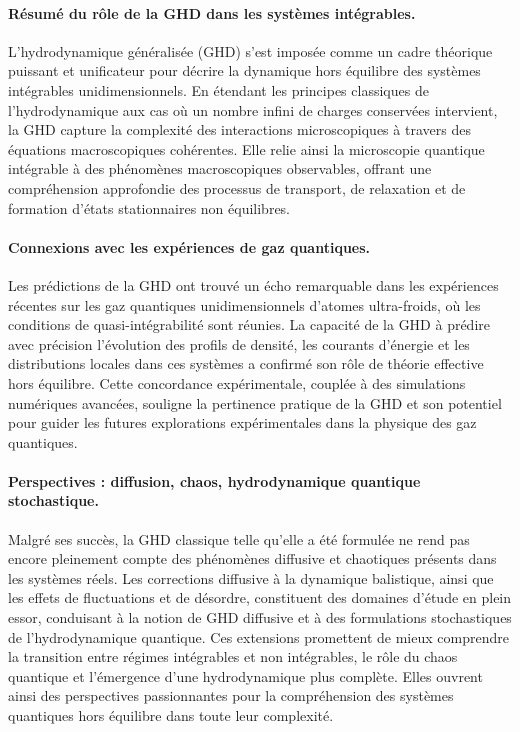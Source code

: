 \paragraph{Résumé du rôle de la GHD dans les systèmes intégrables.}
L’hydrodynamique généralisée (GHD) s’est imposée comme un cadre théorique puissant et unificateur pour décrire la dynamique hors équilibre des systèmes intégrables unidimensionnels. En étendant les principes classiques de l’hydrodynamique aux cas où un nombre infini de charges conservées intervient, la GHD capture la complexité des interactions microscopiques à travers des équations macroscopiques cohérentes. Elle relie ainsi la microscopie quantique intégrable à des phénomènes macroscopiques observables, offrant une compréhension approfondie des processus de transport, de relaxation et de formation d’états stationnaires non équilibres.

\paragraph{Connexions avec les expériences de gaz quantiques.}
Les prédictions de la GHD ont trouvé un écho remarquable dans les expériences récentes sur les gaz quantiques unidimensionnels d’atomes ultra-froids, où les conditions de quasi-intégrabilité sont réunies. La capacité de la GHD à prédire avec précision l’évolution des profils de densité, les courants d’énergie et les distributions locales dans ces systèmes a confirmé son rôle de théorie effective hors équilibre. Cette concordance expérimentale, couplée à des simulations numériques avancées, souligne la pertinence pratique de la GHD et son potentiel pour guider les futures explorations expérimentales dans la physique des gaz quantiques.

\paragraph{Perspectives : diffusion, chaos, hydrodynamique quantique stochastique.}
Malgré ses succès, la GHD classique telle qu’elle a été formulée ne rend pas encore pleinement compte des phénomènes diffusive et chaotiques présents dans les systèmes réels. Les corrections diffusive à la dynamique balistique, ainsi que les effets de fluctuations et de désordre, constituent des domaines d’étude en plein essor, conduisant à la notion de GHD diffusive et à des formulations stochastiques de l’hydrodynamique quantique. Ces extensions promettent de mieux comprendre la transition entre régimes intégrables et non intégrables, le rôle du chaos quantique et l’émergence d’une hydrodynamique plus complète. Elles ouvrent ainsi des perspectives passionnantes pour la compréhension des systèmes quantiques hors équilibre dans toute leur complexité.

